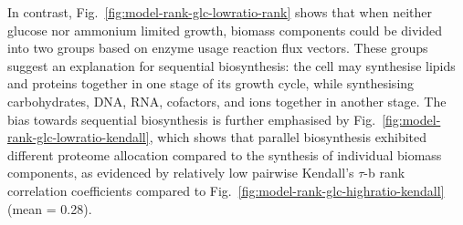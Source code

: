 In contrast, Fig.\ \ref{fig:model-rank-glc-lowratio-rank} shows that when neither glucose nor ammonium limited growth, biomass components could be divided into two groups based on enzyme usage reaction flux vectors.
These groups suggest an explanation for sequential biosynthesis: the cell may synthesise lipids and proteins together in one stage of its growth cycle, while synthesising carbohydrates, DNA, RNA, cofactors, and ions together in another stage.
The bias towards sequential biosynthesis is further emphasised by Fig.\ \ref{fig:model-rank-glc-lowratio-kendall}, which shows that parallel biosynthesis exhibited different proteome allocation compared to the synthesis of individual biomass components, as evidenced by relatively low pairwise Kendall's $\tau$-b rank correlation coefficients compared to Fig.\ \ref{fig:model-rank-glc-highratio-kendall} (mean = 0.28).

